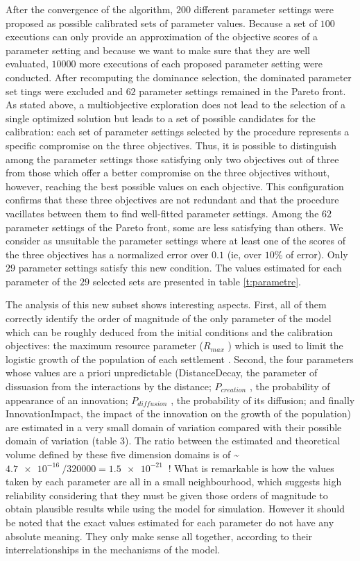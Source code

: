 After the convergence of the algorithm, $200$ different parameter settings were proposed as possible calibrated sets of parameter values. Because a set of $100$ executions can only provide an approximation of the objective scores of a parameter setting and because we want to make sure that they are well evaluated, $\num{10000}$ more executions of each proposed parameter setting were conducted. After recomputing the dominance selection, the dominated parameter set­ tings were excluded and $62$ parameter settings remained in the Pareto front. As stated above, a multiobjective exploration does not lead to the selection of a single optimized solution but leads to a set of possible candidates for the calibration: each set of parameter settings selected by the procedure represents a specific compromise on the three objectives. Thus, it is possible to distinguish among the parameter settings those satisfying only two objectives out of three from those which offer a better compromise on the three objectives without, however, reaching the best possible values on each objective. This configuration confirms that these three objectives are not redundant and that the procedure vacillates between them to find well-fitted parameter settings. Among the $62$ parameter settings of the Pareto front, some are less satisfying than others. We consider as unsuitable the parameter settings where at least one of the scores of the three objectives has a normalized error over $0.1$ (ie, over $10\%$ of error). Only $29$ parameter settings satisfy this new condition. The values estimated for each parameter of the $29$ selected sets are presented in table \ref{t:parametre}.


The analysis of this new subset shows interesting aspects. First, all of them correctly identify the order of magnitude of the only parameter of the model which can be roughly deduced from the initial conditions and the calibration objectives: the maximum resource parameter ($R_{max}$ ) which is used to limit the logistic growth of the population of each settlement . Second, the four parameters whose values are a priori unpredictable (DistanceDecay, the parameter of dissuasion from the interactions by the distance; $P_{creation}$ , the probability of appearance of an innovation; $P_{diffusion}$ , the probability of its diffusion; and finally InnovationImpact, the impact of the innovation on the growth of the population) are estimated in a very small domain of variation compared with their possible domain of variation (table 3). The ratio between the estimated and theoretical volume defined by these five dimension domains is of \~ $\SI{4.7e-16}{} / \num{320000}{} = \SI{1.5e-21}{}$ ! What is remarkable is how the values taken by each parameter are all in a small neighbourhood, which suggests high reliability considering that they must be given those orders of magnitude to obtain plausible results while using the model for simulation. However it should be noted that the exact values estimated for each parameter do not have any absolute meaning. They only make sense all together, according to their interrelationships in the mechanisms of the model.

